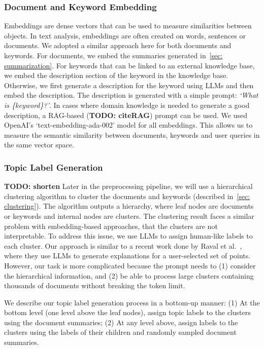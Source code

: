 \subsubsection{Document and Keyword Embedding}\label{sec: embeddings} 
Embeddings are dense vectors that can be used to measure similarities between objects.
In text analysis, embeddings are often created on words, sentences or documents.
We adopted a similar approach here for both documents and keywords.
For documents, we embed the summaries generated in~\autoref{sec: summarization}.
For keywords that can be linked to an external knowledge base,
we embed the description section of the keyword in the knowledge base.
Otherwise, we first generate a description for the keyword using LLMs and then embed the description.
The description is generated with a simple prompt: \textit{`What is \{keyword\}?'}.
In cases where domain knowledge is needed to generate a good description, a RAG-based (\textbf{TODO: cite{RAG}}) prompt can be used.
We used OpenAI's `text-embedding-ada-002' model for all embeddings. 
This allows us to measure the semantic similarity between documents, keywords and user queries in the same vector space.

\subsubsection{Topic Label Generation}\label{sec: tag_assignment}
\textbf{TODO: shorten}
Later in the preprocessing pipeline, we will use a hierarchical clustering algorithm to cluster the documents and keywords (described in~\autoref{sec: clustering}). 
The algorithm outputs a hierarchy, where leaf nodes are documents or keywords and internal nodes are clusters.
The clustering result faces a similar problem with embedding-based approaches, that the clusters are not interpretable.
To address this issue, we use LLMs to assign human-like labels to each cluster.
Our approach is similar to a recent work done by Raval et al.~\cite{raval2023explainandtrust}, where they use LLMs to generate explanations for a user-selected set of points.
However, our task is more complicated because the prompt needs to (1) consider the hierarchical information, and (2) be able to process large clusters containing thousands of documents without breaking the token limit.

We describe our topic label generation process in a bottom-up manner:
(1) At the bottom level (one level above the leaf nodes), assign topic labels to the clusters using the document summaries;
(2) At any level above, assign labels to the clusters using the labels of their children and randomly sampled document summaries.

